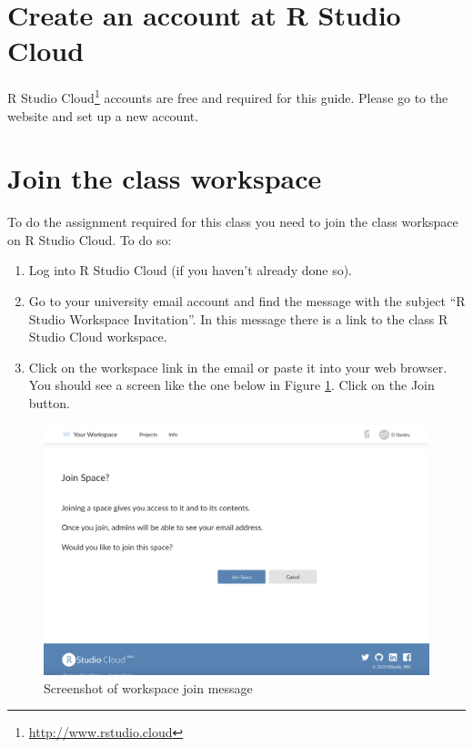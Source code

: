 \documentclass[
]{krantz}
\renewcommand{\href}[2]{#2\footnote{\url{#1}}}
\begin{document}
\hypertarget{create-an-account-at-r-studio-cloud}{%
\section{Create an account at R Studio Cloud}\label{create-an-account-at-r-studio-cloud}}

\href{http://www.rstudio.cloud}{R Studio Cloud} accounts are free and required for this guide. Please go to the website and set up a new account.

\hypertarget{join-the-class-workspace}{%
\section{Join the class workspace}\label{join-the-class-workspace}}

To do the assignment required for this class you need to join the class workspace on R Studio Cloud. To do so:

\begin{enumerate}
\def\labelenumi{\arabic{enumi}.}
\item
  Log into R Studio Cloud (if you haven't already done so).
\item
  Go to your university email account and find the message with the subject ``R Studio Workspace Invitation''. In this message there is a link to the class R Studio Cloud workspace.
\item
  Click on the workspace link in the email or paste it into your web browser. You should see a screen like the one below in Figure \ref{fig:join}. Click on the Join button.
\end{enumerate}

\begin{figure}
\includegraphics[width=0.7\linewidth]{ch_introduction/images/screenshot_join} \caption{Screenshot of workspace join message}\label{fig:join}
\end{figure}
\end{document}

